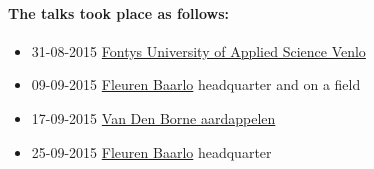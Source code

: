 \paragraph{The talks took place as follows:}
\begin{itemize}
	\item 31-08-2015 \href{http://fontys.nl}{Fontys University of Applied Science Venlo}
	\item 09-09-2015 \href{http://fleuren.net}{Fleuren Baarlo} headquarter and on a field
	\item 17-09-2015 \href{http://www.vandenborneaardappelen.com}{Van Den Borne aardappelen} 
	\item 25-09-2015 \href{http://fleuren.net}{Fleuren Baarlo} headquarter
\end{itemize}